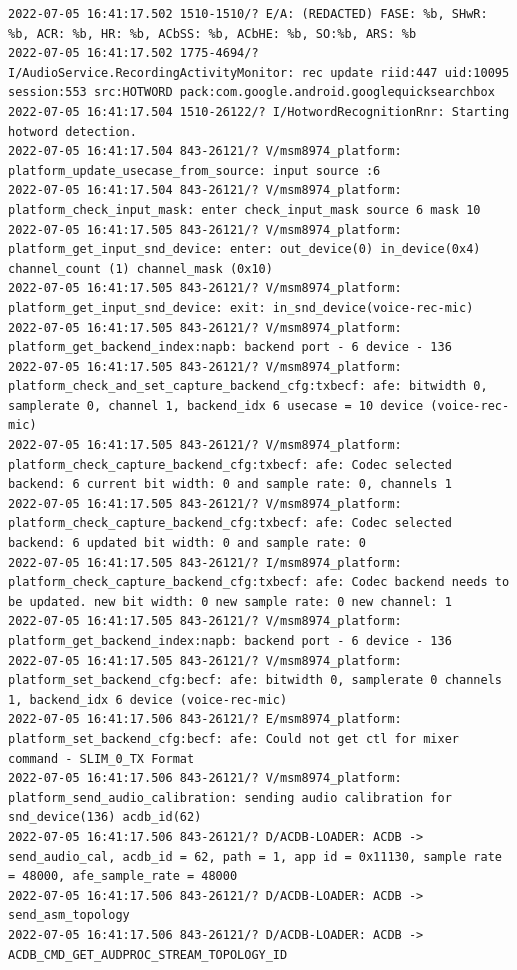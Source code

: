 \documentclass[a4paper,12pt]{book}
\begin{document}
\begin{lstlisting}
2022-07-05 16:41:17.502 1510-1510/? E/A: (REDACTED) FASE: %b, SHwR: %b, ACR: %b, HR: %b, ACbSS: %b, ACbHE: %b, SO:%b, ARS: %b
2022-07-05 16:41:17.502 1775-4694/? I/AudioService.RecordingActivityMonitor: rec update riid:447 uid:10095 session:553 src:HOTWORD pack:com.google.android.googlequicksearchbox
2022-07-05 16:41:17.504 1510-26122/? I/HotwordRecognitionRnr: Starting hotword detection.
2022-07-05 16:41:17.504 843-26121/? V/msm8974_platform: platform_update_usecase_from_source: input source :6
2022-07-05 16:41:17.504 843-26121/? V/msm8974_platform: platform_check_input_mask: enter check_input_mask source 6 mask 10
2022-07-05 16:41:17.505 843-26121/? V/msm8974_platform: platform_get_input_snd_device: enter: out_device(0) in_device(0x4) channel_count (1) channel_mask (0x10)
2022-07-05 16:41:17.505 843-26121/? V/msm8974_platform: platform_get_input_snd_device: exit: in_snd_device(voice-rec-mic)
2022-07-05 16:41:17.505 843-26121/? V/msm8974_platform: platform_get_backend_index:napb: backend port - 6 device - 136 
2022-07-05 16:41:17.505 843-26121/? V/msm8974_platform: platform_check_and_set_capture_backend_cfg:txbecf: afe: bitwidth 0, samplerate 0, channel 1, backend_idx 6 usecase = 10 device (voice-rec-mic)
2022-07-05 16:41:17.505 843-26121/? V/msm8974_platform: platform_check_capture_backend_cfg:txbecf: afe: Codec selected backend: 6 current bit width: 0 and sample rate: 0, channels 1
2022-07-05 16:41:17.505 843-26121/? V/msm8974_platform: platform_check_capture_backend_cfg:txbecf: afe: Codec selected backend: 6 updated bit width: 0 and sample rate: 0
2022-07-05 16:41:17.505 843-26121/? I/msm8974_platform: platform_check_capture_backend_cfg:txbecf: afe: Codec backend needs to be updated. new bit width: 0 new sample rate: 0 new channel: 1
2022-07-05 16:41:17.505 843-26121/? V/msm8974_platform: platform_get_backend_index:napb: backend port - 6 device - 136 
2022-07-05 16:41:17.505 843-26121/? V/msm8974_platform: platform_set_backend_cfg:becf: afe: bitwidth 0, samplerate 0 channels 1, backend_idx 6 device (voice-rec-mic)
2022-07-05 16:41:17.506 843-26121/? E/msm8974_platform: platform_set_backend_cfg:becf: afe: Could not get ctl for mixer command - SLIM_0_TX Format
2022-07-05 16:41:17.506 843-26121/? V/msm8974_platform: platform_send_audio_calibration: sending audio calibration for snd_device(136) acdb_id(62)
2022-07-05 16:41:17.506 843-26121/? D/ACDB-LOADER: ACDB -> send_audio_cal, acdb_id = 62, path = 1, app id = 0x11130, sample rate = 48000, afe_sample_rate = 48000
2022-07-05 16:41:17.506 843-26121/? D/ACDB-LOADER: ACDB -> send_asm_topology
2022-07-05 16:41:17.506 843-26121/? D/ACDB-LOADER: ACDB -> ACDB_CMD_GET_AUDPROC_STREAM_TOPOLOGY_ID

\end{lstlisting}
\end{document}
